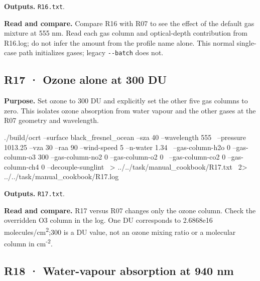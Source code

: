 \textbf{Outputs. }\texttt{R16.txt}.

\textbf{Read and compare. }Compare R16 with R07 to see the effect of the default gas mixture at 555 nm. Read each gas column and optical-depth contribution from R16.log; do not infer the amount from the profile name alone. This normal single-case path initializes gases; legacy \texttt{-\allowbreak{}-\allowbreak{}batch} does not.


\subsection{R17 · Ozone alone at 300 DU}
\label{sec:auto:09_cookbook:4.2}

\label{recipe:R17}

\textbf{Purpose. }Set ozone to 300 DU and explicitly set the other five gas columns to zero. This isolates ozone absorption from water vapour and the other gases at the R07 geometry and wavelength.

\noindent\begin{minipage}{\linewidth}
\begin{ManualCode}

./build/ocrt --surface black_fresnel_ocean --sza 40 --wavelength 555 \
  --pressure 1013.25 --vza 30 --raa 90 --wind-speed 5 --n-water 1.34 \
  --gas-column-h2o 0 --gas-column-o3 300 --gas-column-no2 0 --gas-column-o2 0 \
  --gas-column-co2 0 --gas-column-ch4 0 --decouple-sunglint \
  > ../../task/manual_cookbook/R17.txt \
  2> ../../task/manual_cookbook/R17.log

\end{ManualCode}
\end{minipage}\par

\textbf{Outputs. }\texttt{R17.txt}.

\textbf{Read and compare. }R17 versus R07 changes only the ozone column. Check the overridden O3 column in the log. One DU corresponds to 2.6868e16 molecules/cm\textsuperscript{2};300 is a DU value, not an ozone mixing ratio or a molecular column in cm\textsuperscript{-2}.


\subsection{R18 · Water-vapour absorption at 940 nm}
\label{sec:auto:09_cookbook:4.3}

